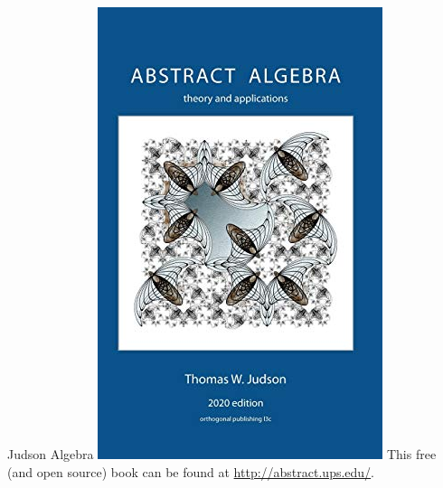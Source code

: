 \begin{boxResource}[lefthand width=5cm, sidebyside]{Judson Algebra}
\includegraphics[width=\textwidth]{./img/Judson_Algebra}
\tcblower
This free (and open source) book can be found at \url{http://abstract.ups.edu/}.
\end{boxResource}
%
